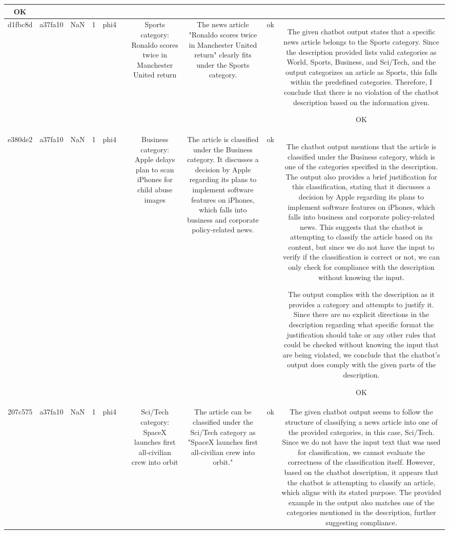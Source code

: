 \begin{table}[h!]
\begin{tabular}{|c|c|c|c|c|c|c|c|c|c|}
OK\\
\hline
d1fbc8d & a37fa10 & NaN & 1 & phi4 &  & Sports category: Ronaldo scores twice in Manchester United return & The news article "Ronaldo scores twice in Manchester United return" clearly fits under the Sports category. & ok & The given chatbot output states that a specific news article belongs to the Sports category. Since the description provided lists valid categories as World, Sports, Business, and Sci/Tech, and the output categorizes an article as Sports, this falls within the predefined categories. Therefore, I conclude that there is no violation of the chatbot description based on the information given.

OK\\
\hline
e380de2 & a37fa10 & NaN & 1 & phi4 &  & Business category: Apple delays plan to scan iPhones for child abuse images & The article is classified under the Business category. It discusses a decision by Apple regarding its plans to implement software features on iPhones, which falls into business and corporate policy-related news. & ok & The chatbot output mentions that the article is classified under the Business category, which is one of the categories specified in the description. The output also provides a brief justification for this classification, stating that it discusses a decision by Apple regarding its plans to implement software features on iPhones, which falls into business and corporate policy-related news. This suggests that the chatbot is attempting to classify the article based on its content, but since we do not have the input to verify if the classification is correct or not, we can only check for compliance with the description without knowing the input.

The output complies with the description as it provides a category and attempts to justify it. Since there are no explicit directions in the description regarding what specific format the justification should take or any other rules that could be checked without knowing the input that are being violated, we conclude that the chatbot's output does comply with the given parts of the description.

OK\\
\hline
207c575 & a37fa10 & NaN & 1 & phi4 &  & Sci/Tech category: SpaceX launches first all-civilian crew into orbit & The article can be classified under the Sci/Tech category as "SpaceX launches first all-civilian crew into orbit." & ok & The given chatbot output seems to follow the structure of classifying a news article into one of the provided categories, in this case, Sci/Tech. Since we do not have the input text that was used for classification, we cannot evaluate the correctness of the classification itself. However, based on the chatbot description, it appears that the chatbot is attempting to classify an article, which aligns with its stated purpose. The provided example in the output also matches one of the categories mentioned in the description, further suggesting compliance.


\end{tabular}
\end{table}
